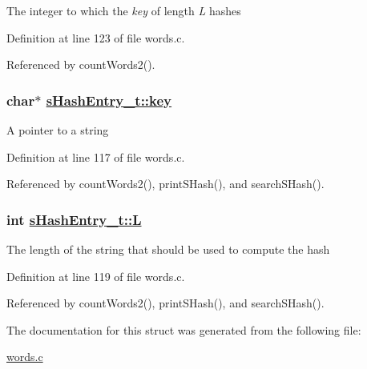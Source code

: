 The integer to which the {\em key\/} of length {\em L\/} hashes 

Definition at line 123 of file words.c.

Referenced by count\-Words2().\hypertarget{structsHashEntry__t_o0}{
\subsubsection[key]{\setlength{\rightskip}{0pt plus 5cm}char$\ast$ \hyperlink{structsHashEntry__t_o0}{s\-Hash\-Entry\_\-t::key}}}
\label{structsHashEntry__t_o0}


A pointer to a string 

Definition at line 117 of file words.c.

Referenced by count\-Words2(), print\-SHash(), and search\-SHash().\hypertarget{structsHashEntry__t_o1}{
\subsubsection[L]{\setlength{\rightskip}{0pt plus 5cm}int \hyperlink{structsHashEntry__t_o1}{s\-Hash\-Entry\_\-t::L}}}
\label{structsHashEntry__t_o1}


The length of the string that should be used to compute the hash 

Definition at line 119 of file words.c.

Referenced by count\-Words2(), print\-SHash(), and search\-SHash().

The documentation for this struct was generated from the following file:\begin{CompactItemize}
\item 
\hyperlink{words_8c}{words.c}\end{CompactItemize}
